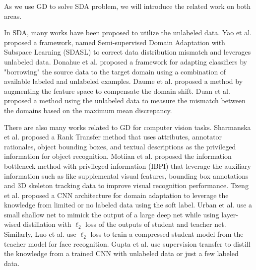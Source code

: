 As we use GD to solve SDA problem, we will introduce the related work on both areas.

In SDA, many works have been proposed to utilize the unlabeled data. Yao {et al.} \cite{yao2015semi} proposed a framework, named Semi-supervised Domain Adaptation with Subspace Learning (SDASL) to correct data distribution mismatch and leverages unlabeled data. Donahue {et al.}\cite{Donahue_2013_CVPR} proposed a framework for adapting classifiers by "borrowing" the source data to the target domain using a combination of available labeled and unlabeled examples. Daume {et al.} \cite{daume2010frustratingly} proposed a method by augmenting the feature space to compensate the domain shift. Duan {et al.} \cite{duan2012visual} proposed a method using the unlabeled data to measure the mismatch between the domains based on the maximum mean discrepancy.

There are also many works related to GD for computer vision tasks. Sharmanska et al. \cite{Sharmanska_2013_ICCV} proposed a Rank Transfer method that uses attributes, annotator
rationales, object bounding boxes, and textual descriptions as the privileged information for object recognition. Motiian et al. \cite{Motiian_2016_CVPR} proposed {the information bottleneck method with privileged information (IBPI)} that leverage the auxiliary information such as like supplemental visual features, bounding box annotations and 3D skeleton tracking data to improve visual recognition performance. Tzeng et al. \cite{Tzeng_2015_ICCV} proposed a CNN architecture for domain adaptation to leverage the knowledge from limited or no labeled data using the soft label. Urban et al. \cite{urban2016deep} use a small shallow net to mimick the output of a large deep net while using layer-wised distillation with $\ell_2$ loss of the outputs of student and teacher net. Similarly, Luo et al. \cite{luo2016face} use $\ell_2$ loss to train a compressed student model from the teacher model for face recognition. Gupta et al. \cite{Gupta_2016_CVPR} use supervision transfer to distill the knowledge from a trained CNN with unlabeled data or just a few labeled data.
